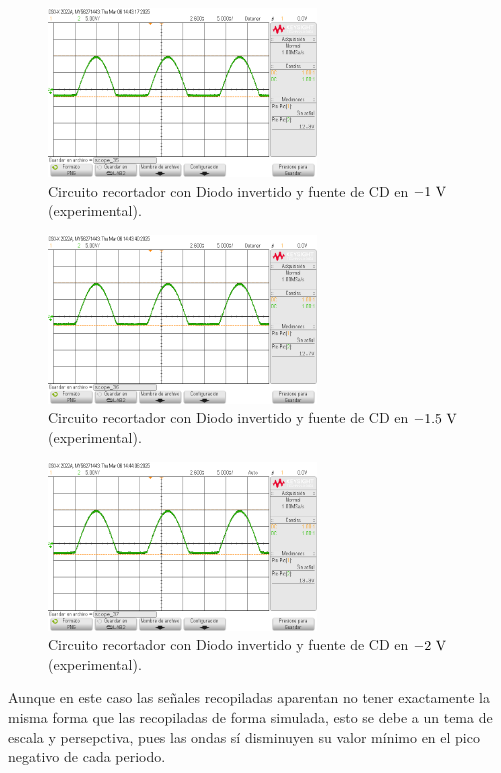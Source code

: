 \documentclass[journal]{IEEEtran}
\begin{document}
\begin{figure}[H]
        \centering
        \includegraphics[width=2.8in]{SignalExperimental_17.png}
        \caption{Circuito recortador con Diodo invertido y fuente de CD en $-1~\textnormal{V}$ (experimental).}
        \label{fig:SignalExperimental_18}
\end{figure}
\begin{figure}[H]
        \centering
        \includegraphics[width=2.8in]{SignalExperimental_18.png}
        \caption{Circuito recortador con Diodo invertido y fuente de CD en $-1.5~\textnormal{V}$ (experimental).}
        \label{fig:SignalExperimental_19}
\end{figure}
\begin{figure}[H]
        \centering
        \includegraphics[width=2.8in]{SignalExperimental_19.png}
        \caption{Circuito recortador con Diodo invertido y fuente de CD en $-2~\textnormal{V}$ (experimental).}
        \label{fig:SignalExperimental_20}
\end{figure}

Aunque en este caso las señales recopiladas aparentan no tener exactamente la misma forma que las recopiladas de forma simulada,
esto se debe a un tema de escala y persepctiva, pues las ondas sí disminuyen su valor mínimo en el pico negativo de cada periodo.
\end{document}
